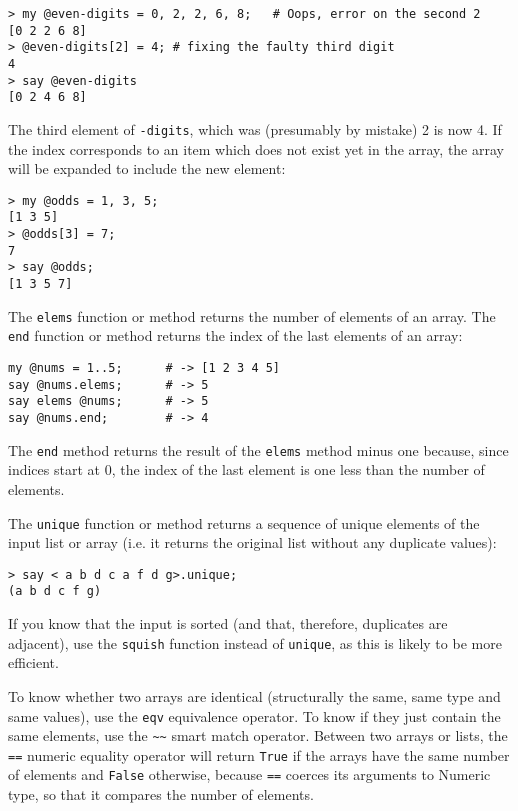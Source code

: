 \begin{verbatim}
> my @even-digits = 0, 2, 2, 6, 8;   # Oops, error on the second 2
[0 2 2 6 8]
> @even-digits[2] = 4; # fixing the faulty third digit
4
> say @even-digits
[0 2 4 6 8]
\end{verbatim}
%

The third element of {\tt \@even-digits}, which was  
(presumably by mistake) 2 is now 4. If the index corresponds 
to an item which does not exist yet in the array, the array 
will be expanded to include the new element:

\begin{verbatim}
> my @odds = 1, 3, 5;
[1 3 5]
> @odds[3] = 7;
7
> say @odds;
[1 3 5 7]
\end{verbatim}


The {\tt elems} function or method returns the number of 
elements of an array. The {\tt end} function or method 
returns the index of the last elements of an array:

\begin{verbatim}
my @nums = 1..5;      # -> [1 2 3 4 5]
say @nums.elems;      # -> 5
say elems @nums;      # -> 5
say @nums.end;        # -> 4
\end{verbatim}

The {\tt end} method returns the result of the {\tt elems} 
method minus one because, since indices start at 0, the 
index of the last element is one less than the number 
of elements.

The {\tt unique} function or method returns a sequence 
of unique elements of the input list or array (i.e. 
it returns the original list without any duplicate 
values):

\begin{verbatim}
> say < a b d c a f d g>.unique;
(a b d c f g)
\end{verbatim}

If you know that the input is sorted (and that, therefore, 
duplicates are adjacent), use the {\tt squish} function 
instead of {\tt unique}, as this is likely to be more 
efficient.

To know whether two arrays are identical (structurally the 
same, same type and same values), use the {\tt eqv} equivalence 
operator. To know if they just contain the same elements, use 
the \verb'~~' smart match operator. Between two arrays or lists, the 
\verb'==' numeric equality operator will return {\tt True} if the 
arrays have the same number of elements and {\tt False} otherwise, 
because \verb'==' coerces its arguments to Numeric type, so that 
it compares the number of elements.


